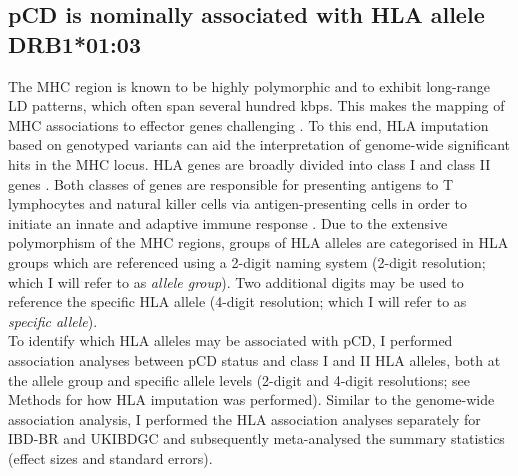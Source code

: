 \subsection{pCD is nominally associated with HLA allele DRB1*01:03}
The MHC region is known to be highly polymorphic and to exhibit long-range LD patterns, which often span several hundred kbps. This makes the mapping of MHC associations to effector genes challenging \cite{Matzaraki2017-za}. To this end, HLA imputation based on genotyped variants can aid the interpretation of genome-wide significant hits in the MHC locus. HLA genes are broadly divided into class I and class II genes \cite{Marsh2010-mq}. Both classes of genes are responsible for presenting antigens to T lymphocytes and natural killer cells via antigen-presenting cells in order to initiate an innate and adaptive immune response \cite{Shiina2009-wt}. Due to the extensive polymorphism of the MHC regions, groups of HLA alleles are categorised in HLA groups which are referenced using a 2-digit naming system \cite{hla-nomenclature} (2-digit resolution; which I will refer to as \textit{allele group}). Two additional digits may be used to reference the specific HLA allele \cite{hla-nomenclature-4digit} (4-digit resolution; which I will refer to as \textit{specific allele}). \\

To identify which HLA alleles may be associated with pCD, I performed association analyses between pCD status and class I and II HLA alleles, both at the allele group and specific allele levels (2-digit and 4-digit resolutions; see Methods for how HLA imputation was performed). Similar to the genome-wide association analysis, I performed the HLA association analyses separately for IBD-BR and UKIBDGC and subsequently meta-analysed the summary statistics (effect sizes and standard errors). \\

